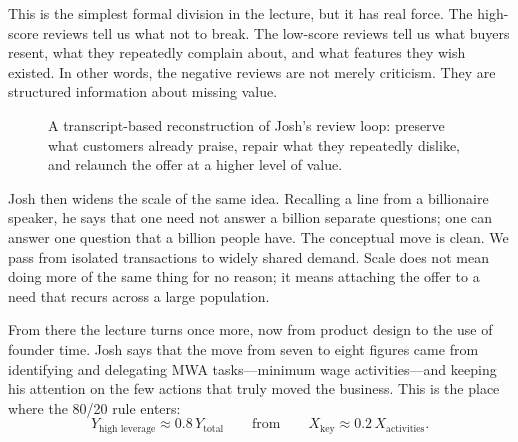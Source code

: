 This is the simplest formal division in the lecture, but it has real force. The high-score reviews tell us what not to break. The low-score reviews tell us what buyers resent, what they repeatedly complain about, and what features they wish existed. In other words, the negative reviews are not merely criticism. They are structured information about missing value.

\begin{figure}[h]
\centering
{}

A transcript-based reconstruction of Josh's review loop: preserve what customers already praise, repair what they repeatedly dislike, and relaunch the offer at a higher level of value.
\end{figure}

Josh then widens the scale of the same idea. Recalling a line from a billionaire speaker, he says that one need not answer a billion separate questions; one can answer one question that a billion people have. The conceptual move is clean. We pass from isolated transactions to widely shared demand. Scale does not mean doing more of the same thing for no reason; it means attaching the offer to a need that recurs across a large population.

From there the lecture turns once more, now from product design to the use of founder time. Josh says that the move from seven to eight figures came from identifying and delegating MWA tasks---minimum wage activities---and keeping his attention on the few actions that truly moved the business. This is the place where the 80/20 rule enters:
\begin{equation}
Y_{\text{high leverage}} \approx 0.8\,Y_{\text{total}}
\qquad \text{from} \qquad
X_{\text{key}} \approx 0.2\,X_{\text{activities}}.
\end{equation}

